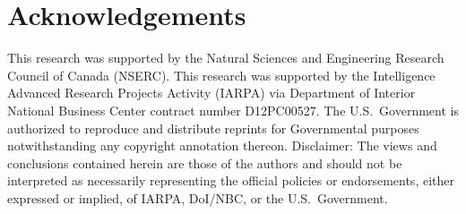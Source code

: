 \documentclass{article}
\begin{document}
\section{Acknowledgements}

This research was supported by the Natural Sciences and Engineering
Research Council of Canada (NSERC). This research was supported by the
Intelligence Advanced Research Projects Activity (IARPA) via
Department of Interior National Business Center contract number
D12PC00527. The U.S.\ Government is authorized to reproduce and
distribute reprints for Governmental purposes notwithstanding any
copyright annotation thereon.  Disclaimer: The views and conclusions
contained herein are those of the authors and should not be
interpreted as necessarily representing the official policies or
endorsements, either expressed or implied, of IARPA, DoI/NBC, or the
U.S.\ Government.

\appendix









\end{document}
